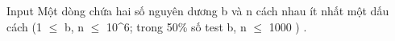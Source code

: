 Input
Một dòng chứa hai số nguyên dương b       và n       cách nhau ít nhất một dấu cách (1  $\le$  b, n  $\le$  10^6; trong 50\% số test b, n  $\le$  1000       )      .
